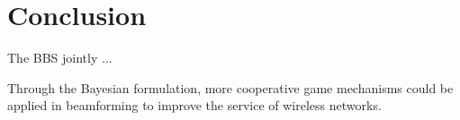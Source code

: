\section{Conclusion}
\label{sec:conclusion}
The BBS jointly ...

Through the Bayesian formulation, more cooperative game mechanisms could be applied in 
beamforming to improve the service of wireless networks.

